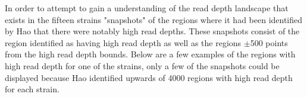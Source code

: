 \documentclass[../main.tex]{subfiles}
\begin{document}
%
%

In order to attempt to gain a understanding of the read depth landscape that exists in the fifteen strains "snapshots" of the regions where it had been identified by Hao that there were notably high read depths. These snapshots consist of the region identified as having high read depth as well as the regions $\pm$500 points from the high read depth bounds. Below are a few examples of the regions with high read depth for one of the strains, only a few of the snapshots could be displayed because Hao identified upwards of 4000 regions with high read depth for each strain.

\begin{table}[H]
	\begin{center}
	 \label{tab:sitesctjnum}
	\vspace{0.5cm}
	\end{center}
\end{table}
\end{document}
